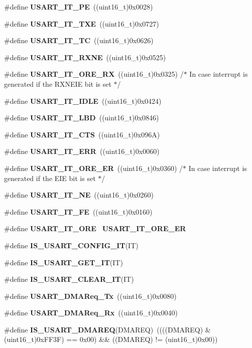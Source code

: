 \begin{DoxyCompactItemize}
\item 
\#define \textbf{ U\+S\+A\+R\+T\+\_\+\+I\+T\+\_\+\+PE}~((uint16\+\_\+t)0x0028)
\item 
\#define \textbf{ U\+S\+A\+R\+T\+\_\+\+I\+T\+\_\+\+T\+XE}~((uint16\+\_\+t)0x0727)
\item 
\#define \textbf{ U\+S\+A\+R\+T\+\_\+\+I\+T\+\_\+\+TC}~((uint16\+\_\+t)0x0626)
\item 
\#define \textbf{ U\+S\+A\+R\+T\+\_\+\+I\+T\+\_\+\+R\+X\+NE}~((uint16\+\_\+t)0x0525)
\item 
\#define \textbf{ U\+S\+A\+R\+T\+\_\+\+I\+T\+\_\+\+O\+R\+E\+\_\+\+RX}~((uint16\+\_\+t)0x0325) /$\ast$ In case interrupt is generated if the R\+X\+N\+E\+I\+E bit is set $\ast$/
\item 
\#define \textbf{ U\+S\+A\+R\+T\+\_\+\+I\+T\+\_\+\+I\+D\+LE}~((uint16\+\_\+t)0x0424)
\item 
\#define \textbf{ U\+S\+A\+R\+T\+\_\+\+I\+T\+\_\+\+L\+BD}~((uint16\+\_\+t)0x0846)
\item 
\#define \textbf{ U\+S\+A\+R\+T\+\_\+\+I\+T\+\_\+\+C\+TS}~((uint16\+\_\+t)0x096\+A)
\item 
\#define \textbf{ U\+S\+A\+R\+T\+\_\+\+I\+T\+\_\+\+E\+RR}~((uint16\+\_\+t)0x0060)
\item 
\#define \textbf{ U\+S\+A\+R\+T\+\_\+\+I\+T\+\_\+\+O\+R\+E\+\_\+\+ER}~((uint16\+\_\+t)0x0360) /$\ast$ In case interrupt is generated if the E\+I\+E bit is set $\ast$/
\item 
\#define \textbf{ U\+S\+A\+R\+T\+\_\+\+I\+T\+\_\+\+NE}~((uint16\+\_\+t)0x0260)
\item 
\#define \textbf{ U\+S\+A\+R\+T\+\_\+\+I\+T\+\_\+\+FE}~((uint16\+\_\+t)0x0160)
\item 
\#define \textbf{ U\+S\+A\+R\+T\+\_\+\+I\+T\+\_\+\+O\+RE}~\textbf{ U\+S\+A\+R\+T\+\_\+\+I\+T\+\_\+\+O\+R\+E\+\_\+\+ER}
\item 
\#define \textbf{ I\+S\+\_\+\+U\+S\+A\+R\+T\+\_\+\+C\+O\+N\+F\+I\+G\+\_\+\+IT}(IT)
\item 
\#define \textbf{ I\+S\+\_\+\+U\+S\+A\+R\+T\+\_\+\+G\+E\+T\+\_\+\+IT}(IT)
\item 
\#define \textbf{ I\+S\+\_\+\+U\+S\+A\+R\+T\+\_\+\+C\+L\+E\+A\+R\+\_\+\+IT}(IT)
\item 
\#define \textbf{ U\+S\+A\+R\+T\+\_\+\+D\+M\+A\+Req\+\_\+\+Tx}~((uint16\+\_\+t)0x0080)
\item 
\#define \textbf{ U\+S\+A\+R\+T\+\_\+\+D\+M\+A\+Req\+\_\+\+Rx}~((uint16\+\_\+t)0x0040)
\item 
\#define \textbf{ I\+S\+\_\+\+U\+S\+A\+R\+T\+\_\+\+D\+M\+A\+R\+EQ}(D\+M\+A\+R\+EQ)~((((D\+M\+A\+R\+EQ) \& (uint16\+\_\+t)0x\+F\+F3\+F) == 0x00) \&\& ((\+D\+M\+A\+R\+E\+Q) != (uint16\+\_\+t)0x00))

\end{DoxyCompactItemize}
